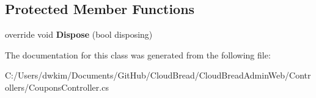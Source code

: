 \subsection*{Protected Member Functions}
\begin{DoxyCompactItemize}
\item 
override void {\bfseries Dispose} (bool disposing)\hypertarget{class_cloud_bread_admin_web_1_1_controllers_1_1_coupons_controller_a2a75abe700e452a7e64bbed73a835ad4}{}\label{class_cloud_bread_admin_web_1_1_controllers_1_1_coupons_controller_a2a75abe700e452a7e64bbed73a835ad4}

\end{DoxyCompactItemize}


The documentation for this class was generated from the following file\+:\begin{DoxyCompactItemize}
\item 
C\+:/\+Users/dwkim/\+Documents/\+Git\+Hub/\+Cloud\+Bread/\+Cloud\+Bread\+Admin\+Web/\+Controllers/Coupons\+Controller.\+cs\end{DoxyCompactItemize}
